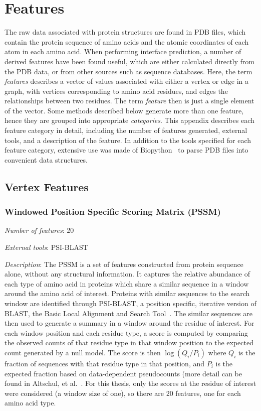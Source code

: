 \chapter{Features}
\label{appendix:features}

The raw data associated with protein structures are found in PDB files, which contain the protein sequence of amino acids and the atomic coordinates of each atom in each amino acid.
When performing interface prediction, a number of derived features have been found useful, which are either calculated directly from the PDB data, or from other sources such as sequence databases.
Here, the term \emph{features} describes a vector of values associated with either a vertex or edge in a graph, with vertices corresponding to amino acid residues, and edges the relationships between two residues.
The term \emph{feature} then is just a single element of the vector.
Some methods described below generate more than one feature, hence they are grouped into appropriate \emph{categories}.
This appendix describes each feature category in detail, including the number of features generated, external tools, and a description of the feature.
In addition to the tools specified for each feature category, extensive use was made of Biopython~\cite{cock2009} to parse PDB files into convenient data structures. 

\section{Vertex Features}

\subsection{Windowed Position Specific Scoring Matrix (PSSM)}
\noindent
\emph{Number of features}: 20

\noindent
\emph{External tools}: PSI-BLAST~\cite{altschul1997}

\noindent
\emph{Description}:
The PSSM is a set of features constructed from protein sequence alone, without any structural information.
It captures the relative abundance of each type of amino acid in proteins which share a similar sequence in a window around the amino acid of interest.
Proteins with similar sequences to the search window are identified through PSI-BLAST, a position specific, iterative version of BLAST, the Basic Local Alignment and Search Tool~\cite{altschul1990}.
The similar sequences are then used to generate a summary in a window around the residue of interest.
For each window position and each residue type, a score is computed by comparing the observed counts of that residue type in that window position to the expected count generated by a null model.
The score is then $\log(Q_i/P_i)$ where $Q_i$ is the fraction of sequences with that residue type in that position, and $P_i$ is the expected fraction based on data-dependent pseudocounts (more detail can be found in Altschul, et al.~\cite{altschul1990}.
For this thesis, only the scores at the residue of interest were considered (a window size of one), so there are 20 features, one for each amino acid type. 

